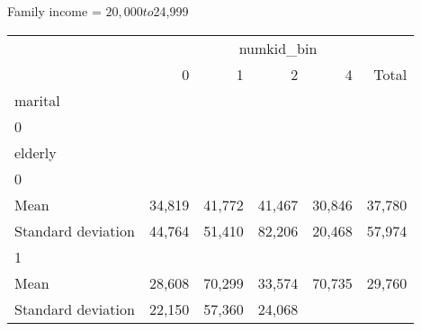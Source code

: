Family income = $20,000 to $24,999
\begin{tabular}{llllll}
\cline{1-6}
\multicolumn{1}{c}{} &
  \multicolumn{5}{|c}{numkid\_bin} \\
\multicolumn{1}{c}{} &
  \multicolumn{1}{|r}{0} &
  \multicolumn{1}{r}{1} &
  \multicolumn{1}{r}{2} &
  \multicolumn{1}{r}{4} &
  \multicolumn{1}{r}{Total} \\
\cline{1-6}
\multicolumn{1}{l}{marital} &
  \multicolumn{1}{|r}{} &
  \multicolumn{1}{r}{} &
  \multicolumn{1}{r}{} &
  \multicolumn{1}{r}{} &
  \multicolumn{1}{r}{} \\
\multicolumn{1}{l}{\hspace{1em}0} &
  \multicolumn{1}{|r}{} &
  \multicolumn{1}{r}{} &
  \multicolumn{1}{r}{} &
  \multicolumn{1}{r}{} &
  \multicolumn{1}{r}{} \\
\multicolumn{1}{l}{\hspace{2em}elderly} &
  \multicolumn{1}{|r}{} &
  \multicolumn{1}{r}{} &
  \multicolumn{1}{r}{} &
  \multicolumn{1}{r}{} &
  \multicolumn{1}{r}{} \\
\multicolumn{1}{l}{\hspace{3em}0} &
  \multicolumn{1}{|r}{} &
  \multicolumn{1}{r}{} &
  \multicolumn{1}{r}{} &
  \multicolumn{1}{r}{} &
  \multicolumn{1}{r}{} \\
\multicolumn{1}{l}{\hspace{4em}Mean} &
  \multicolumn{1}{|r}{34,819} &
  \multicolumn{1}{r}{41,772} &
  \multicolumn{1}{r}{41,467} &
  \multicolumn{1}{r}{30,846} &
  \multicolumn{1}{r}{37,780} \\
\multicolumn{1}{l}{\hspace{4em}Standard deviation} &
  \multicolumn{1}{|r}{44,764} &
  \multicolumn{1}{r}{51,410} &
  \multicolumn{1}{r}{82,206} &
  \multicolumn{1}{r}{20,468} &
  \multicolumn{1}{r}{57,974} \\
\multicolumn{1}{l}{\hspace{3em}1} &
  \multicolumn{1}{|r}{} &
  \multicolumn{1}{r}{} &
  \multicolumn{1}{r}{} &
  \multicolumn{1}{r}{} &
  \multicolumn{1}{r}{} \\
\multicolumn{1}{l}{\hspace{4em}Mean} &
  \multicolumn{1}{|r}{28,608} &
  \multicolumn{1}{r}{70,299} &
  \multicolumn{1}{r}{33,574} &
  \multicolumn{1}{r}{70,735} &
  \multicolumn{1}{r}{29,760} \\
\multicolumn{1}{l}{\hspace{4em}Standard deviation} &
  \multicolumn{1}{|r}{22,150} &
  \multicolumn{1}{r}{57,360} &
  \multicolumn{1}{r}{24,068} &

\end{tabular}
